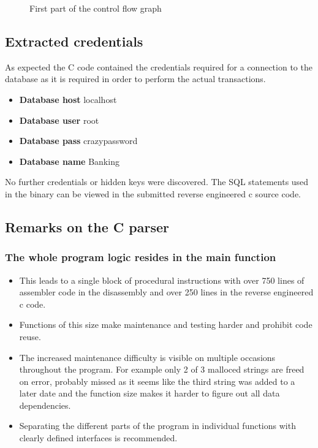 \begin{figure}[h!tbp]
	\caption{First part of the control flow graph}
	\label{figure:re_cfg}
\end{figure}

\subsection{Extracted credentials}
As expected the C code contained the credentials required for a connection to
the database as it is required in order to perform the actual transactions.
\begin{itemize}
	\item \textbf{Database host} localhost
	\item \textbf{Database user} root
	\item \textbf{Database pass} crazypassword
	\item \textbf{Database name} Banking
\end{itemize}
No further credentials or hidden keys were discovered. The SQL statements used
in the binary can be viewed in the submitted reverse engineered c source code.

\subsection{Remarks on the C parser}
\subsubsection*{The whole program logic resides in the main function}
\begin{itemize}
	\item This leads to a single block of procedural instructions with
		over 750 lines of assembler code in the disassembly and over 250
		lines in the reverse engineered c code.
	\item Functions of this size make maintenance and testing harder
		and prohibit code reuse.
	\item The increased maintenance difficulty is visible on multiple
		occasions throughout the program. For example only 2 of 3
		malloced strings are freed on error, probably missed as it seems
		like the third string was added to a later date and the
		function size makes it harder to figure out all data
		dependencies.
	\item Separating the different parts of the program in individual
		functions with clearly defined interfaces is recommended.
\end{itemize}

